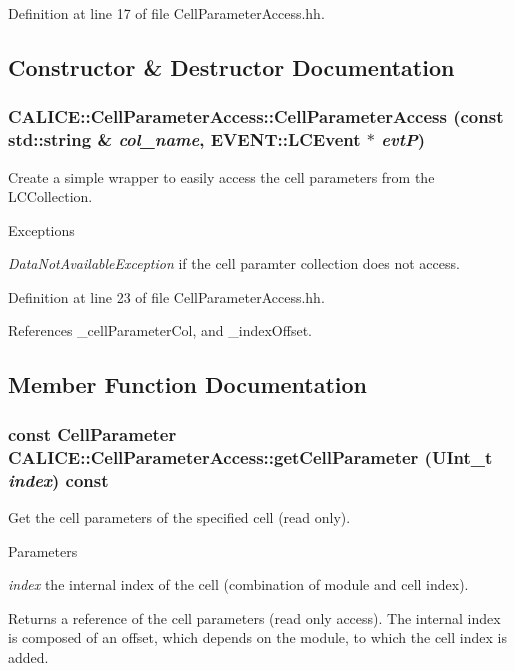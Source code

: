Definition at line 17 of file CellParameterAccess.hh.

\subsection{Constructor \& Destructor Documentation}
\subsubsection[{CellParameterAccess}]{\setlength{\rightskip}{0pt plus 5cm}CALICE::CellParameterAccess::CellParameterAccess (const std::string \& {\em col\_\-name}, \/  EVENT::LCEvent $\ast$ {\em evtP})\hspace{0.3cm}{\ttfamily  [inline]}}\label{classCALICE_1_1CellParameterAccess_a60d0f03312481332cd43e499bcef974a}


Create a simple wrapper to easily access the cell parameters from the LCCollection. 
\begin{DoxyExceptions}{Exceptions}
\item[{\em DataNotAvailableException}]if the cell paramter collection does not access. \end{DoxyExceptions}


Definition at line 23 of file CellParameterAccess.hh.

References \_\-cellParameterCol, and \_\-indexOffset.

\subsection{Member Function Documentation}
\subsubsection[{getCellParameter}]{\setlength{\rightskip}{0pt plus 5cm}const {\bf CellParameter} CALICE::CellParameterAccess::getCellParameter (UInt\_\-t {\em index}) const\hspace{0.3cm}{\ttfamily  [inline]}}\label{classCALICE_1_1CellParameterAccess_a20186873138db5f0ae1f26862764ebe8}


Get the cell parameters of the specified cell (read only). 
\begin{DoxyParams}{Parameters}
\item[{\em index}]the internal index of the cell (combination of module and cell index). \end{DoxyParams}
\begin{DoxyReturn}{Returns}
a reference of the cell parameters (read only access). The internal index is composed of an offset, which depends on the module, to which the cell index is added. 
\end{DoxyReturn}


